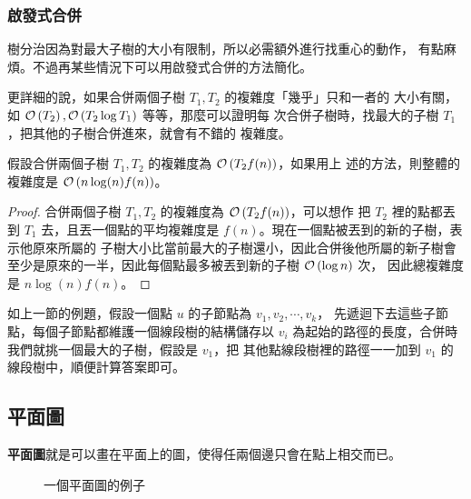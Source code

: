 \documentclass[a4paper,12pt]{book}
\begin{document}
\subsubsection{啟發式合併}
樹分治因為對最大子樹的大小有限制，所以必需額外進行找重心的動作，
有點麻煩。不過再某些情況下可以用啟發式合併的方法簡化。

更詳細的說，如果合併兩個子樹 $T_1, T_2$ 的複雜度「幾乎」只和一者的
大小有關，如 $\operatorname{\mathcal{O}}\left(T_2\right), \operatorname{\mathcal{O}}\left(T_2 \log T_1\right)$ 等等，那麼可以證明每
次合併子樹時，找最大的子樹 $T_1$，把其他的子樹合併進來，就會有不錯的
複雜度。

\begin{theorem}
  假設合併兩個子樹 $T_1, T_2$ 的複雜度為 $\operatorname{\mathcal{O}}\left(T_2 f(n)\right)$，如果用上
  述的方法，則整體的複雜度是 $\operatorname{\mathcal{O}}\left(n \log(n) f(n)\right)$。
\end{theorem}
\begin{proof}
  合併兩個子樹 $T_1, T_2$ 的複雜度為 $\operatorname{\mathcal{O}}\left(T_2 f(n)\right)$，可以想作
  把 $T_2$ 裡的點都丟到 $T_1$ 去，且丟一個點的平均複雜度是
  $f(n)$。現在一個點被丟到的新的子樹，表示他原來所屬的
  子樹大小比當前最大的子樹還小，因此合併後他所屬的新子樹會
  至少是原來的一半，因此每個點最多被丟到新的子樹 $\operatorname{\mathcal{O}}\left(\log n\right)$ 次，
  因此總複雜度是 $n \log(n) f(n)$。
\end{proof}

如上一節的例題，假設一個點 $u$ 的子節點為 $v_1, v_2, \cdots, v_k$，
先遞迴下去這些子節點，每個子節點都維護一個線段樹的結構儲存以 $v_i$
為起始的路徑的長度，合併時我們就挑一個最大的子樹，假設是 $v_1$，把
其他點線段樹裡的路徑一一加到 $v_1$ 的線段樹中，順便計算答案即可。


\subsection{平面圖}
{\bf 平面圖}就是可以畫在平面上的圖，使得任兩個邊只會在點上相交而已。

\begin{figure}[H]
  \centering
  
  \caption{一個平面圖的例子}
\end{figure}
\end{document}
